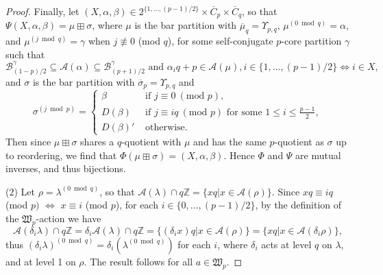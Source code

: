 \documentclass[ALCO, Unicode,published]{cedram}
\newcommand*\nicefrac[2]{#1/#2}
\begin{document}
\begin{proof}
Finally, let $(X,\alpha,\beta)\in2^{\{1,\dots,\nicefrac{(p-1)}{2}\}}\times\overline{C}_p\times\overline{C}_q$, so that $\Psi(X,\alpha,\beta)=\mu\boxplus\sigma$, where $\mu$ is the bar partition with $\overline{\mu}_q=\Upsilon_{p,q}$, $\mu^{(0\bmod q)}=\alpha$, and $\mu^{(j\bmod q)}=\gamma$ when $j\not\equiv0$ (mod $q$), for some self-conjugate $p$-core partition $\gamma$ such that 
$$\mathcal{B}^\gamma_{\nicefrac{(1-p)}{2}}\subseteq\mathcal{A}(\alpha)\subseteq\mathcal{B}^\gamma_{\nicefrac{(p+1)}{2}}\text{ and }\alpha_iq+p\in\mathcal{A}(\mu),i\in\{1,\dots,\nicefrac{(p-1)}{2}\}\Leftrightarrow i\in X,$$ 
and $\sigma$ is the bar partition with $\overline{\sigma}_p=\Upsilon_{p,q}$ and 
$$\sigma^{(j\bmod p)}=\begin{cases}\beta&\text{ if } j\equiv0\:(\text{mod }p),\\
D(\beta)&\text{ if } j\equiv iq\:(\text{mod }p)\text{ for some }1\leq i\leq\tfrac{p-1}{2},\\
D(\beta)'&\text{ otherwise.}\end{cases}$$ 
Then since $\mu\boxplus\sigma$ shares a $q$-quotient with $\mu$ and has the same $p$-quotient as $\sigma$ up to reordering, we find that $\Phi(\mu\boxplus\sigma)=(X,\alpha,\beta)$. Hence $\Phi$ and $\Psi$ are mutual inverses, and thus bijections. 

\smallskip

(2) Let $\rho=\lambda^{(0\bmod q)}$, so that $\mathcal{A}(\lambda)\cap q\mathbb{Z}=\{xq|x\in\mathcal{A}(\rho)\}$. Since $xq\equiv iq$ (mod $p)$ $\Leftrightarrow$ $x\equiv i$ (mod $p$), for each $i\in\{0,\dots,\nicefrac{(p-1)}{2}\}$, by the definition of the $\mathfrak{W}_p$-action we have  
$$\mathcal{A}(\delta_i\lambda)\cap q\mathbb{Z}=\delta_i\mathcal{A}(\lambda)\cap q\mathbb{Z}=\{(\delta_ix)q|x\in\mathcal{A}(\rho)\}=\{xq|x\in\mathcal{A}(\delta_i\rho)\},$$ 
thus $(\delta_i\lambda)^{(0\bmod q)}=\delta_i(\lambda^{(0\bmod q)})$ for each $i$, where $\delta_i$ acts at level $q$ on $\lambda$, and at level 1 on $\rho$. The result follows for all $a\in\mathfrak{W}_p$. 
\end{proof}
\end{document}
